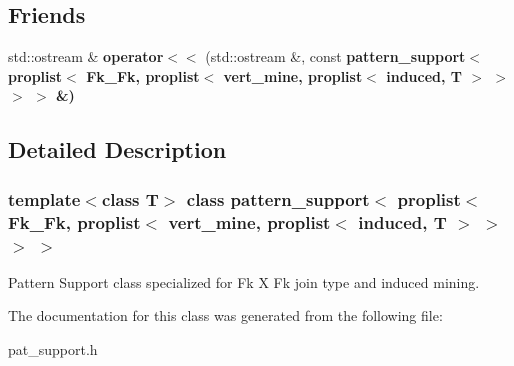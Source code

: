 \subsection*{Friends}
\begin{CompactItemize}
\item 
std::ostream \& \textbf{operator$<$$<$} (std::ostream \&, const \bf{pattern\_\-support}$<$ \bf{proplist}$<$ Fk\_\-Fk, \bf{proplist}$<$ vert\_\-mine, \bf{proplist}$<$ induced, T $>$ $>$ $>$ $>$ \&)\label{classpattern__support_3_01proplist_3_01Fk__Fk_00_01proplist_3_01vert__mine_00_01proplist_3_01induced_00_01T_01_4_01_4_01_4_01_4_5bbe3ef3a0e9f7fa5f39edae55b92cec}

\end{CompactItemize}


\subsection{Detailed Description}
\subsubsection*{template$<$class T$>$ class pattern\_\-support$<$ proplist$<$ Fk\_\-Fk, proplist$<$ vert\_\-mine, proplist$<$ induced, T $>$ $>$ $>$ $>$}

Pattern Support class specialized for Fk X Fk join type and induced mining. 



The documentation for this class was generated from the following file:\begin{CompactItemize}
\item 
pat\_\-support.h\end{CompactItemize}
